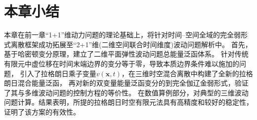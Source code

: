 \section{本章小结}

本章在前一章“1+1”维动力问题的理论基础上，将针对时间--空间全域的完全弱形式离散框架成功拓展至“2+1”维(二维空间联合时间维度)波动问题解析中。
首先，基于哈密顿变分原理，建立了二维平面弹性波动问题总能量泛函体系。
针对传统有限元中虚位移在时间末端边界的变分等于零，导致本质边界条件难以施加的问题，
引入了拉格朗日乘子变量$v(\boldsymbol{x},t)$，在三维时空混合离散中构建了全新的拉格朗日混合能量泛函，
再对新的双变量能量泛函变分的到完全伽辽金弱形式，验证了其与多维波动问题的控制方程的等价性。
在数值算例部分，对典型的三维波动问题计算。结果表明，所提的拉格朗日时空有限元法具有高精度和较好的稳定性，
证明了该方案的有效性。